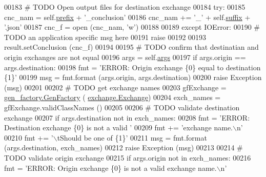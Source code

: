 \begin{DoxyCode}
{00183         \textcolor{comment}{# TODO Open output files for destination exchange}
00184         \textcolor{keywordflow}{try}:
00185             cnc\_nam  =  self.\hyperlink{classe2e_1_1_application_a027ff25e5409ae17584978a09fc2611a}{prefix} + \textcolor{stringliteral}{'\_conclusion'}
00186             cnc\_nam += \textcolor{stringliteral}{'\_'} + self.\hyperlink{classe2e_1_1_application_a4d824ad36b051d2d629edb314385df0d}{suffix} + \textcolor{stringliteral}{'.json'}
00187             cnc\_f = open (cnc\_nam, \textcolor{stringliteral}{'w'})
00188             
00189         \textcolor{keywordflow}{except} IOError:
00190             \textcolor{comment}{# TODO an application specific msg here}
00191             \textcolor{keywordflow}{raise}
00192             
00193         result.setConclusion (cnc\_f)
00194             
00195         \textcolor{comment}{# TODO confirm that destinatian and origin exchanges are not equal}
00196         args = self.\hyperlink{classe2e_1_1_application_abade6fc2e2c04ddd7e48137a2a7721bd}{args} 
00197         \textcolor{keywordflow}{if} args.origin == args.destination:
00198             fmt = \textcolor{stringliteral}{'ERROR: Origin exchange \{0\} equal to destination \{1\}'}
00199             msg = fmt.format (args.origin, args.destination)
00200             \textcolor{keywordflow}{raise} Exception (msg)
00201 
00202         \textcolor{comment}{# TODO get exchange names }
00203         gfExchange = \hyperlink{classgen__factory_1_1_gen_factory}{gen\_factory.GenFactory} (
      \hyperlink{classexchange_1_1_exchange}{exchange.Exchange})
00204         exch\_names = gfExchange.validClassNames ()
00205             
00206         \textcolor{comment}{# TODO validate destination exchange}
00207         \textcolor{keywordflow}{if} args.destination \textcolor{keywordflow}{not} \textcolor{keywordflow}{in} exch\_names:
00208             fmt  = \textcolor{stringliteral}{'ERROR: Destination exchange \{0\} is not a valid '}
00209             fmt += \textcolor{stringliteral}{'exchange name.\(\backslash\)n'}
00210             fmt += \textcolor{stringliteral}{'\(\backslash\)tShould be one of \{1\}'}
00211             msg = fmt.format (args.destination, exch\_names)
00212             \textcolor{keywordflow}{raise} Exception (msg)
00213             
00214         \textcolor{comment}{# TODO validate origin exchange}
00215         \textcolor{keywordflow}{if} args.origin \textcolor{keywordflow}{not} \textcolor{keywordflow}{in} exch\_names:
00216             fmt  = \textcolor{stringliteral}{'ERROR: Origin exchange \{0\} is not a valid exchange name.\(\backslash\)n'}
}
\end{DoxyCode}
